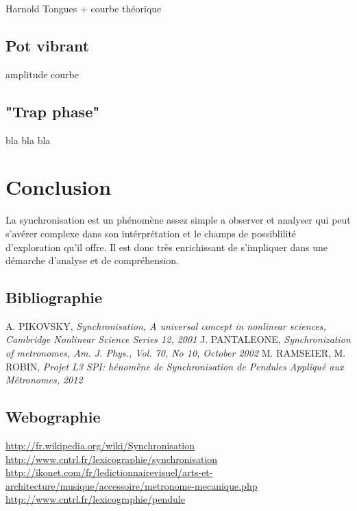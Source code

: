 \documentclass[a4paper,11pt]{report}
\begin{document}
Harnold Tongues + courbe théorique

\section{Pot vibrant}

amplitude courbe

\section{"Trap phase"}

bla bla bla
\chapter*{Conclusion}
La synchronisation est un phénomène assez simple a observer et analyser qui peut s'avérer complexe dans son intérprétation et le champs de possiblilité d'exploration qu'il offre. Il est donc très enrichissant de s'impliquer dans une démarche d'analyse et de compréhension.
\renewcommand{\bibname}{Références}
\begin{thebibliography}{2}
\section*{Bibliographie}
 A. PIKOVSKY, {\it Synchronisation, A universal concept in nonlinear sciences, Cambridge Nonlinear Science Series 12, 2001}
 J. PANTALEONE, {\it Synchronization of metronomes, Am. J. Phys., Vol. 70, No 10, October 2002}
 M. RAMSEIER, M. ROBIN, {\it Projet L3 SPI: hénomène de Synchronisation de Pendules Appliqué aux Métronomes, 2012}
\section*{Webographie}
 \url{http://fr.wikipedia.org/wiki/Synchronisation}
 \url{http://www.cntrl.fr/lexicographie/synchronisation}
 \url{http://ikonet.com/fr/ledictionnairevisuel/arts-et-architecture/musique/accessoire/metronome-mecanique.php}
 \url{http://www.cntrl.fr/lexicographie/pendule}
\end{thebibliography}
\appendix
\end{document}
